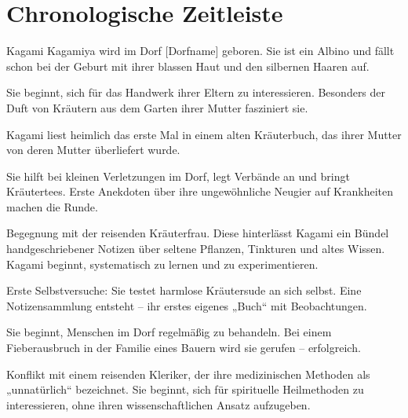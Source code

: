 \documentclass[12pt,a4paper]{article}
\begin{document}
\newpage

\section{Chronologische Zeitleiste}

\begin{multicols}{2}
\begin{description}[leftmargin=1.5cm, style=nextline, font=\normalfont\bfseries]

\item[0 Jahre (Geburt)]  
Kagami Kagamiya wird im Dorf [Dorfname] geboren. Sie ist ein Albino und fällt schon bei der Geburt mit ihrer blassen Haut und den silbernen Haaren auf.

\item[5 Jahre]  
Sie beginnt, sich für das Handwerk ihrer Eltern zu interessieren. Besonders der Duft von Kräutern aus dem Garten ihrer Mutter fasziniert sie.

\item[7 Jahre]  
Kagami liest heimlich das erste Mal in einem alten Kräuterbuch, das ihrer Mutter von deren Mutter überliefert wurde.

\item[10 Jahre]  
Sie hilft bei kleinen Verletzungen im Dorf, legt Verbände an und bringt Kräutertees. Erste Anekdoten über ihre ungewöhnliche Neugier auf Krankheiten machen die Runde.

\item[12 Jahre]  
Begegnung mit der reisenden Kräuterfrau. Diese hinterlässt Kagami ein Bündel handgeschriebener Notizen über seltene Pflanzen, Tinkturen und altes Wissen. Kagami beginnt, systematisch zu lernen und zu experimentieren.

\item[13 Jahre]  
Erste Selbstversuche: Sie testet harmlose Kräutersude an sich selbst. Eine Notizensammlung entsteht – ihr erstes eigenes „Buch“ mit Beobachtungen.

\item[14 Jahre]  
Sie beginnt, Menschen im Dorf regelmäßig zu behandeln. Bei einem Fieberausbruch in der Familie eines Bauern wird sie gerufen – erfolgreich.

\item[15 Jahre]  
Konflikt mit einem reisenden Kleriker, der ihre medizinischen Methoden als „unnatürlich“ bezeichnet. Sie beginnt, sich für spirituelle Heilmethoden zu interessieren, ohne ihren wissenschaftlichen Ansatz aufzugeben.


\end{description}
\end{multicols}
\end{document}
